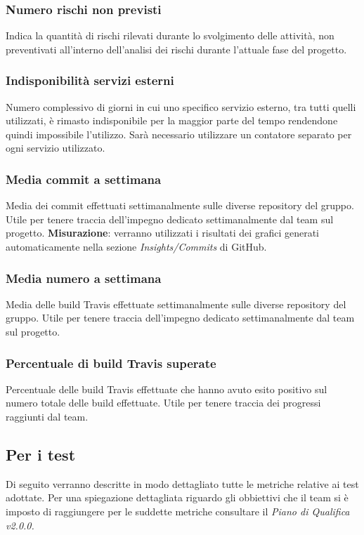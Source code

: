 \subsubsection{Numero rischi non previsti}
Indica la quantità di rischi rilevati durante lo svolgimento delle attività, non preventivati all'interno dell'analisi dei rischi durante l'attuale fase del progetto.
\subsubsection{Indisponibilità servizi esterni}
Numero complessivo di giorni in cui uno specifico servizio esterno, tra tutti quelli utilizzati, è rimasto indisponibile per la maggior parte del tempo rendendone quindi impossibile l'utilizzo. Sarà necessario utilizzare un contatore separato per ogni servizio utilizzato.
\subsubsection{Media commit a settimana}
Media dei commit effettuati settimanalmente sulle diverse repository del gruppo. Utile per tenere traccia dell'impegno dedicato settimanalmente dal team sul progetto. \textbf{Misurazione}: verranno utilizzati i risultati dei grafici generati automaticamente nella sezione \emph{Insights/Commits} di GitHub.
\subsubsection{Media numero   a settimana}
Media delle build Travis effettuate settimanalmente sulle diverse repository del gruppo. Utile per tenere traccia dell'impegno dedicato settimanalmente dal team sul progetto.
\subsubsection{Percentuale di build Travis superate}
Percentuale delle build Travis effettuate che hanno avuto esito positivo sul numero totale delle build effettuate. Utile per tenere traccia dei progressi raggiunti dal team.

\subsection{Per i test}
Di seguito verranno descritte in modo dettagliato tutte le metriche relative ai test adottate. Per una spiegazione dettagliata riguardo gli obbiettivi che il team si è imposto di raggiungere per le suddette metriche consultare il \emph{Piano di Qualifica v2.0.0.}

